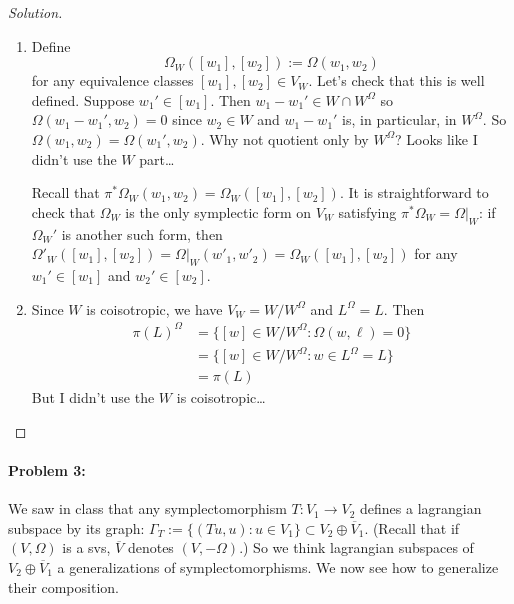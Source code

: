 \begin{proof}[Solution]\leavevmode 
	\begin{enumerate}[label=\alph*.]
		\item Define
			\[\Omega_{W}([w_1],[w_2]):=\Omega(w_1,w_2)\]
			for any equivalence classes $[w_1],[w_2]\in V_{W}$. Let's check that this is well defined. Suppose $w_1'\in [w_1]$. Then $w_1-w_1'\in W\cap W^{\Omega}$ so $\Omega(w_1-w_1',w_2)=0$ since $w_2\in W$ and $w_1-w_1'$ is, in particular, in $W^{\Omega}$. So $\Omega(w_1,w_2)=\Omega(w_1',w_2)$. {\color{magenta}Why not quotient only by $W^{\Omega}$? Looks like I didn't use the $W$ part…}

			Recall that $\pi^{*} \Omega_{W}(w_1,w_2)=\Omega_{W}([w_1],[w_2])$. It is straightforward to check that $\Omega_{W}$ is the only symplectic form on $V_{W}$ satisfying $\pi^{*} \Omega_{W}=\Omega|_{W}$: if $\Omega_{W}'$ is another such form, then $\Omega'_{W}([w_1],[w_2])=\Omega|_{W}(w'_1,w'_2)=\Omega_{W}([w_1],[w_2])$ for any $w_1'\in [w_1]$ and $w_2'\in [w_2]$.

			\item Since $W$ is coisotropic, we have $V_W=W/W^\Omega$ and $L^\Omega=L$. Then
				\begin{align*}
					\pi(L)^\Omega & =\{[w]\in W/W^\Omega:\Omega(w,\ell)=0\} \\
						      &=\{[w]\in W/W^\Omega:w\in L^\Omega=L\} \\
						      &=\pi(L)
				\end{align*}
				{\color{magenta}But I didn't use the $W$ is coisotropic…}
\end{enumerate}
\end{proof}

\paragraph{Problem 3:}  We saw in class that any symplectomorphism $T:V_1\to V_2$ defines a lagrangian subspace by its graph: $\Gamma_{T}:=\{(Tu,u):u\in V_1 \}\subset V_2\oplus \overline{V}_{1}$. (Recall that if $(V,\Omega)$ is a svs,  $\overline{V}$ denotes $(V,-\Omega)$.) So we think lagrangian subspaces of $V_2\oplus \overline{V}_{1}$ a generalizations of symplectomorphisms. We now see how to generalize their composition. 

